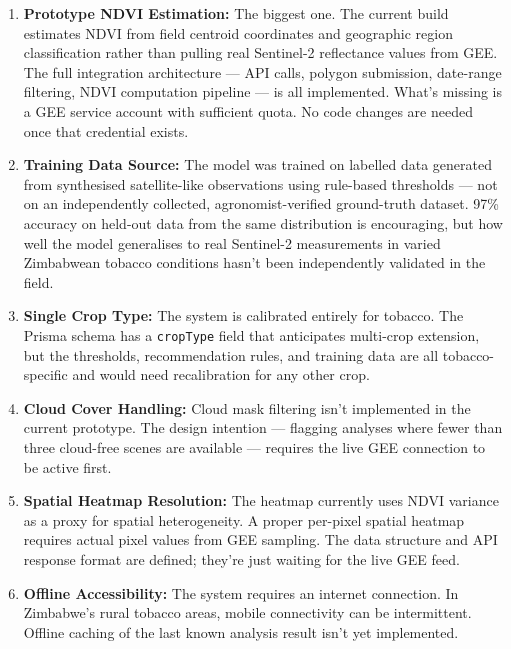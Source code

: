 \begin{enumerate}
  \item \textbf{Prototype NDVI Estimation:} The biggest one. The current build estimates NDVI from field centroid coordinates and geographic region classification rather than pulling real Sentinel-2 reflectance values from GEE. The full integration architecture — API calls, polygon submission, date-range filtering, NDVI computation pipeline — is all implemented. What's missing is a GEE service account with sufficient quota. No code changes are needed once that credential exists.

  \item \textbf{Training Data Source:} The model was trained on labelled data generated from synthesised satellite-like observations using rule-based thresholds — not on an independently collected, agronomist-verified ground-truth dataset. 97\% accuracy on held-out data from the same distribution is encouraging, but how well the model generalises to real Sentinel-2 measurements in varied Zimbabwean tobacco conditions hasn't been independently validated in the field.

  \item \textbf{Single Crop Type:} The system is calibrated entirely for tobacco. The Prisma schema has a \texttt{cropType} field that anticipates multi-crop extension, but the thresholds, recommendation rules, and training data are all tobacco-specific and would need recalibration for any other crop.

  \item \textbf{Cloud Cover Handling:} Cloud mask filtering isn't implemented in the current prototype. The design intention — flagging analyses where fewer than three cloud-free scenes are available — requires the live GEE connection to be active first.

  \item \textbf{Spatial Heatmap Resolution:} The heatmap currently uses NDVI variance as a proxy for spatial heterogeneity. A proper per-pixel spatial heatmap requires actual pixel values from GEE sampling. The data structure and API response format are defined; they're just waiting for the live GEE feed.

  \item \textbf{Offline Accessibility:} The system requires an internet connection. In Zimbabwe's rural tobacco areas, mobile connectivity can be intermittent. Offline caching of the last known analysis result isn't yet implemented.
\end{enumerate}

